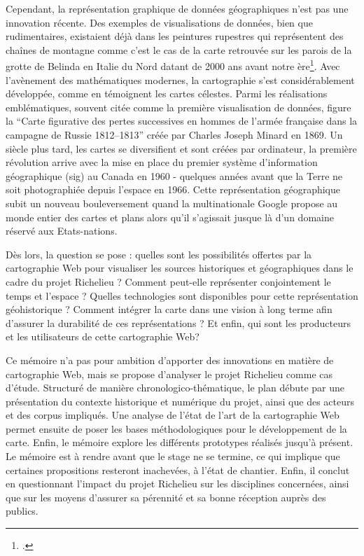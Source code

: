 Cependant, la représentation graphique de données géographiques n'est pas une innovation récente. Des exemples de visualisations de données, bien que rudimentaires, existaient déjà dans les peintures rupestres qui représentent des chaînes de montagne comme c'est le cas de la carte retrouvée sur les parois de la grotte de Belinda en Italie du Nord datant de 2000 ans avant notre ère\footcite{LAMBERTBreve2016}. Avec l'avènement des mathématiques modernes, la cartographie s'est considérablement développée, comme en témoignent les cartes célestes. Parmi les réalisations emblématiques, souvent citée comme la première visualisation de données, figure la \enquote{Carte figurative des pertes successives en hommes de l’armée française dans la campagne de Russie 1812–1813} créée par Charles Joseph Minard en 1869. Un siècle plus tard, les cartes se diversifient et sont créées par ordinateur, la première révolution arrive avec la mise en place du premier système d'information géographique (\acrshort{sig}) au Canada en 1960 - quelques années avant que la Terre ne soit photographiée depuis l'espace en 1966. Cette représentation géographique subit un nouveau bouleversement quand la multinationale Google propose au monde entier des cartes et plans alors qu'il s'agissait jusque là d'un domaine réservé aux Etats-nations.

Dès lors, la question se pose : quelles sont les possibilités offertes par la cartographie Web pour visualiser les sources historiques et géographiques dans le cadre du projet Richelieu ? Comment peut-elle représenter conjointement le temps et l’espace ? Quelles technologies sont disponibles pour cette représentation géohistorique ? Comment intégrer la carte dans une vision à long terme afin d'assurer la durabilité de ces représentations ? Et enfin, qui sont les producteurs et les utilisateurs de cette cartographie Web?

Ce mémoire n’a pas pour ambition d’apporter des innovations en matière de cartographie Web, mais se propose d'analyser le projet Richelieu comme cas d’étude. Structuré de manière chronologico-thématique, le plan débute par une présentation du contexte historique et numérique du projet, ainsi que des acteurs et des corpus impliqués. Une analyse de l'état de l'art de la cartographie Web permet ensuite de poser les bases méthodologiques pour le développement de la carte. Enfin, le mémoire explore les différents prototypes réalisés jusqu'à présent. Le mémoire est à rendre avant que le stage ne se termine,  ce qui implique que certaines propositions resteront inachevées, à l'état de chantier. Enfin, il conclut en questionnant l'impact du projet Richelieu sur les disciplines concernées, ainsi que sur les moyens d'assurer sa pérennité et sa bonne réception auprès des publics.